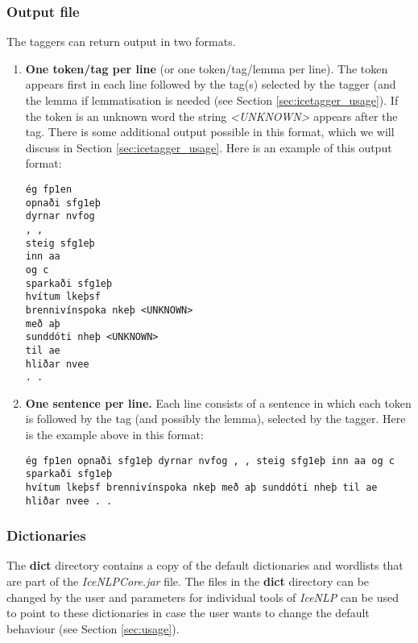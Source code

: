 \documentclass[11pt]{article}
\begin{document}
\subsubsection{Output file}
The taggers can return output in two formats.
\begin{enumerate}
\item {\bf One token/tag per line} (or one token/tag/lemma per line).
The token appears first in each line followed by the tag(s) selected by the tagger (and the lemma if lemmatisation is needed (see Section \ref{sec:icetagger_usage}).
If the token is an unknown word the string \emph{<UNKNOWN>} appears after the tag.
There is some additional output possible in this format, which we will discuss in Section \ref{sec:icetagger_usage}.
Here is an example of this output format:
\begin{verbatim}
ég fp1en
opnaði sfg1eþ
dyrnar nvfog
, ,
steig sfg1eþ
inn aa
og c
sparkaði sfg1eþ
hvítum lkeþsf
brennivínspoka nkeþ <UNKNOWN>
með aþ
sunddóti nheþ <UNKNOWN>
til ae
hliðar nvee
. .
\end{verbatim}

\item {\bf One sentence per line. }
Each line consists of a sentence in which each token is followed by the tag (and possibly the lemma), selected by the tagger.
Here is the example above in this format:
\begin{verbatim}
ég fp1en opnaði sfg1eþ dyrnar nvfog , , steig sfg1eþ inn aa og c sparkaði sfg1eþ
hvítum lkeþsf brennivínspoka nkeþ með aþ sunddóti nheþ til ae hliðar nvee . .
\end{verbatim}
\end{enumerate}

\subsubsection{Dictionaries}
\label{sec:dict}
The {\bf dict} directory contains a copy of the default dictionaries and wordlists that are part of the \emph{IceNLPCore.jar} file. The files in the {\bf dict} directory can be changed by the user and parameters for individual tools of \emph{IceNLP} can be used to point to these dictionaries in case the user wants to change the default behaviour (see Section \ref{sec:usage}).
\end{document}
